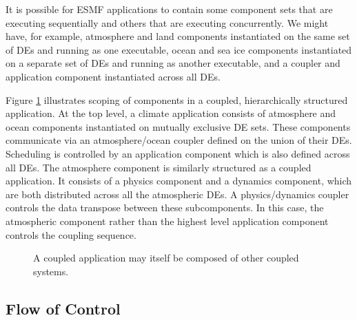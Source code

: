 It is possible for ESMF applications to contain some component sets
that are executing sequentially and others that are executing concurrently.
We might have, for example, atmosphere and land components instantiated 
on the same set of 
DEs and running as one executable, ocean and sea ice 
components instantiated on a separate set of DEs and running as 
another executable, and a coupler and application component 
instantiated across all DEs.

Figure \ref{fig:couplerscaling} illustrates scoping of components
in a coupled, hierarchically structured application.  At the top level, 
a climate application consists of atmosphere and ocean components 
instantiated on mutually exclusive DE sets.  These components communicate 
via an atmosphere/ocean coupler defined on the union of their DEs.  
Scheduling is controlled by an application
component which is also defined across all DEs.  The atmosphere component
is similarly structured as a coupled application.  It consists of a 
physics component and a dynamics component, which are both distributed
across all the atmospheric DEs.  A physics/dynamics coupler controls
the data transpose between these subcomponents.  In this case, the
atmospheric component rather than the highest level application component
controls the coupling sequence.  

\begin{figure}
\caption[{Scoping of Components in a Coupled Application}]{A coupled
application may itself be composed of other coupled systems.}
\label{fig:couplerscaling}
\end{figure}

\subsection{Flow of Control}

